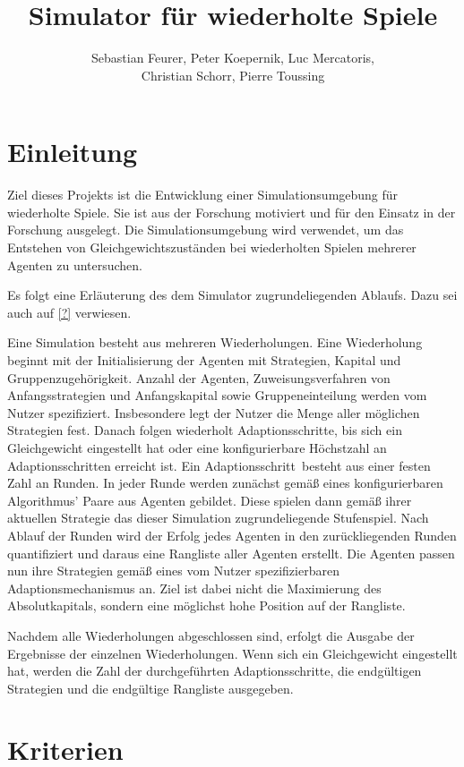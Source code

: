 \documentclass[parskip=full,11pt]{scrartcl}
\title{Simulator für wiederholte Spiele}
\author{Sebastian Feurer, Peter Koepernik, Luc Mercatoris,\\Christian Schorr, Pierre Toussing}
\def\adapt{Adaptionsschritt}
\def\adapts{Adaptionsschritte}
\begin{document}
\maketitle

\section{Einleitung}

Ziel dieses Projekts ist die Entwicklung einer Simulationsumgebung für wiederholte Spiele. Sie ist aus der Forschung motiviert und für den Einsatz in der Forschung ausgelegt. Die Simulationsumgebung wird verwendet, um das Entstehen von Gleichgewichtszuständen bei wiederholten Spielen mehrerer Agenten zu untersuchen. 

Es folgt eine Erläuterung des dem Simulator zugrundeliegenden Ablaufs. Dazu sei auch auf \cref{?} verwiesen.

Eine Simulation besteht aus mehreren Wiederholungen. Eine Wiederholung beginnt mit der Initialisierung der Agenten mit Strategien, Kapital und Gruppenzugehörigkeit. Anzahl der Agenten, Zuweisungsverfahren von Anfangsstrategien und Anfangskapital sowie Gruppeneinteilung werden vom Nutzer spezifiziert. Insbesondere legt der Nutzer die Menge aller möglichen Strategien fest. Danach folgen wiederholt \adapts, bis sich ein Gleichgewicht eingestellt hat oder eine konfigurierbare Höchstzahl an \adapts n erreicht ist. Ein \adapt\ besteht aus einer festen Zahl an Runden. In jeder Runde werden zunächst gemäß eines konfigurierbaren Algorithmus' Paare aus Agenten gebildet. Diese spielen dann gemäß ihrer aktuellen Strategie das dieser Simulation zugrundeliegende Stufenspiel. Nach Ablauf der Runden wird der Erfolg jedes Agenten in den zurückliegenden Runden quantifiziert und daraus eine Rangliste aller Agenten erstellt. Die Agenten passen nun ihre Strategien gemäß eines vom Nutzer spezifizierbaren Adaptionsmechanismus an. Ziel ist dabei nicht die Maximierung des Absolutkapitals, sondern eine möglichst hohe Position auf der Rangliste.

Nachdem alle Wiederholungen abgeschlossen sind, erfolgt die Ausgabe der Ergebnisse der einzelnen Wiederholungen. Wenn sich ein Gleichgewicht eingestellt hat, werden die Zahl der durchgeführten \adapts, die endgültigen Strategien und die endgültige Rangliste ausgegeben.

\pagebreak
\section{Kriterien}
\end{document}
